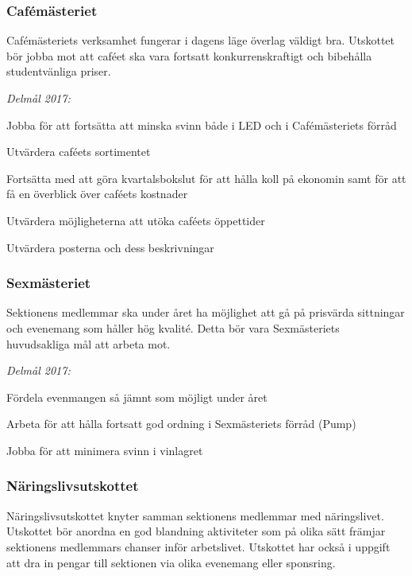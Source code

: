 \documentclass[../_main/handlingar.tex]{subfiles}
\begin{document}
\subsubsection*{Cafémästeriet}
Cafémästeriets verksamhet fungerar i dagens läge överlag väldigt bra. Utskottet bör jobba mot att caféet ska vara fortsatt konkurrenskraftigt och bibehålla studentvänliga priser.

\emph{Delmål 2017:}
\begin{dashlist}
    \item Jobba för att fortsätta att minska svinn både i LED och i Cafémästeriets förråd
    \item Utvärdera caféets sortimentet
    \item Fortsätta med att göra kvartalsbokslut för att hålla koll på ekonomin samt för att få en överblick över caféets kostnader
    \item Utvärdera möjligheterna att utöka caféets öppettider
    \item Utvärdera posterna och dess beskrivningar
\end{dashlist}

\newpage

\subsubsection*{Sexmästeriet}
Sektionens medlemmar ska under året ha möjlighet att gå på prisvärda sittningar och evenemang som håller hög kvalité. Detta bör vara Sexmästeriets huvudsakliga mål att arbeta mot.

\emph{Delmål 2017:}
\begin{dashlist}
    \item Fördela evenmangen så jämnt som möjligt under året
    \item Arbeta för att hålla fortsatt god ordning i Sexmästeriets förråd (Pump)
    \item Jobba för att minimera svinn i vinlagret
\end{dashlist}

\subsubsection*{Näringslivsutskottet}
Näringslivsutskottet knyter samman sektionens medlemmar med näringslivet. Utskottet bör anordna en god blandning aktiviteter som på olika sätt främjar sektionens medlemmars chanser inför arbetslivet. Utskottet har också i uppgift att dra in pengar till sektionen via olika evenemang eller sponsring.
\end{document}
